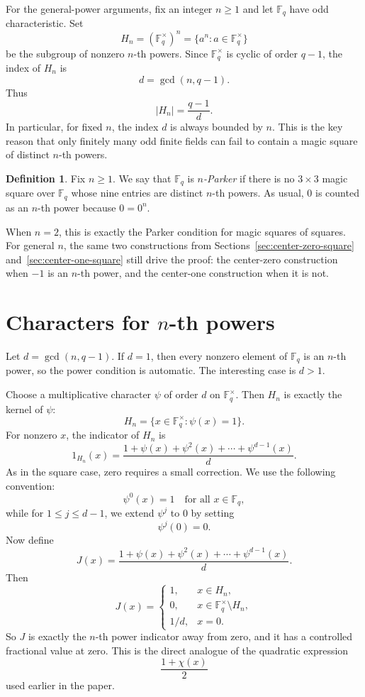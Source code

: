\documentclass{article}
\newcommand{\F}{\mathbb F}
\theoremstyle{definition}
\newtheorem*{definition}{Definition}
\numberwithin{equation}{section}
\begin{document}
For the general-power arguments, fix an integer \(n\geq1\) and let
\(\F_q\) have odd characteristic. Set
\[
H_n=(\F_q^\times)^n=\{a^n:a\in \F_q^\times\}
\]
be the subgroup of nonzero \(n\)-th powers.  Since \(\F_q^\times\) is cyclic of
order \(q-1\), the index of \(H_n\) is
\[
d=\gcd(n,q-1).
\]
Thus
\[
|H_n|=\frac{q-1}{d}.
\]
In particular, for fixed \(n\), the index \(d\) is always bounded by \(n\).  This
is the key reason that only finitely many odd finite fields can fail to contain a
magic square of distinct \(n\)-th powers.

\begin{definition}
Fix \(n\geq 1\).  We say that \(\F_q\) is \emph{\(n\)-Parker} if there is no
\(3\times 3\) magic square over \(\F_q\) whose nine entries are distinct
\(n\)-th powers.  As usual, \(0\) is counted as an \(n\)-th power because
\(0=0^n\).
\end{definition}

When \(n=2\), this is exactly the Parker condition for magic squares of squares.
For general \(n\), the same two constructions from Sections~\ref{sec:center-zero-square} and~\ref{sec:center-one-square} still drive
the proof: the center-zero construction when \(-1\) is an \(n\)-th power, and the
center-one construction when it is not.

\section{Characters for \(n\)-th powers}

Let \(d=\gcd(n,q-1)\).  If \(d=1\), then every nonzero element of \(\F_q\) is an
\(n\)-th power, so the power condition is automatic.  The interesting case is
\(d>1\).

Choose a multiplicative character \(\psi\) of order \(d\) on \(\F_q^\times\).  Then
\(H_n\) is exactly the kernel of \(\psi\):
\[
H_n=\{x\in \F_q^\times:\psi(x)=1\}.
\]
For nonzero \(x\), the indicator of \(H_n\) is
\[
1_{H_n}(x)=\frac{1+\psi(x)+\psi^2(x)+\cdots+\psi^{d-1}(x)}{d}.
\]
As in the square case, zero requires a small correction.  We use the following
convention:
\[
\psi^0(x)=1\quad\text{for all }x\in\F_q,
\]
while for \(1\leq j\leq d-1\), we extend \(\psi^j\) to \(0\) by setting
\[
\psi^j(0)=0.
\]
Now define
\[
J(x)=\frac{1+\psi(x)+\psi^2(x)+\cdots+\psi^{d-1}(x)}{d}.
\]
Then
\[
J(x)=
\begin{cases}
1, & x\in H_n,\\
0, & x\in \F_q^\times\setminus H_n,\\
1/d, & x=0.
\end{cases}
\]
So \(J\) is exactly the \(n\)-th power indicator away from zero, and it has a
controlled fractional value at zero.  This is the direct analogue of the
quadratic expression
\[
\frac{1+\chi(x)}{2}
\]
used earlier in the paper.
\end{document}
